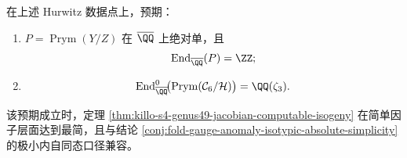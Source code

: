 \begin{conjecture}\label{conj:killo-minimal-extra-endomorphism-large-prym}
在上述 Hurwitz 数据点上，预期：
\begin{enumerate}
  \item \(P=\operatorname{Prym}(Y/Z)\) 在 \(\overline{\QQ}\) 上绝对单，且
  \[
  \operatorname{End}_{\overline{\QQ}}(P)=\ZZ;
  \]
  \item
  \[
  \operatorname{End}^0_{\overline{\QQ}}\!\bigl(\operatorname{Prym}(\mathcal C_6/\mathcal H)\bigr)=\QQ(\zeta_3).
  \]
\end{enumerate}
该预期成立时，定理 \ref{thm:killo-s4-genus49-jacobian-computable-isogeny} 在简单因子层面达到最简，且与结论 \ref{conj:fold-gauge-anomaly-isotypic-absolute-simplicity} 的极小内自同态口径兼容。
\end{conjecture}
